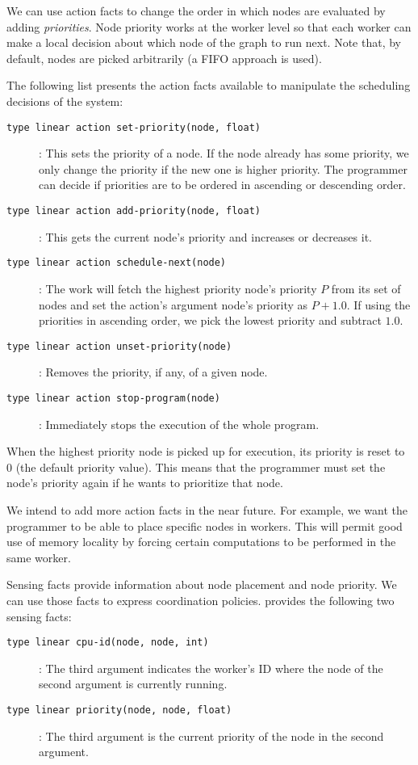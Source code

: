 We can use action facts to change the order in which nodes are evaluated by adding
\emph{priorities}. Node priority works at the worker level
so that each worker can make a local decision about which node of the graph to run next.
Note that, by default, nodes are picked arbitrarily (a FIFO approach is used).

The following list presents the action facts available to manipulate the scheduling decisions of the system:

\begin{description}
   \item[\texttt{type linear action set-priority(node, float)}]: This sets the priority of a node. If the node already has some priority, we only change the priority if the new one is higher priority. The programmer can decide if priorities are to be ordered in ascending or descending order.
   \item[\texttt{type linear action add-priority(node, float)}]: This gets the current node's priority and increases or decreases it.
   \item[\texttt{type linear action schedule-next(node)}]: The work will fetch the highest priority node's priority $P$ from its set of nodes and set the action's argument node's priority as $P + 1.0$. If using the priorities
   in ascending order, we pick the lowest priority and subtract $1.0$.
   \item[\texttt{type linear action unset-priority(node)}]: Removes the priority, if any, of a given node.
   \item[\texttt{type linear action stop-program(node)}]: Immediately stops the execution of the whole program.
\end{description}

When the highest priority node is picked up for execution, its priority is reset to 0 (the default priority value). This means that
the programmer must set the node's priority again if he wants to prioritize that node.

We intend to add more action facts in the near future. For example, we want the programmer to be able to place specific nodes in workers. This will permit good use of
memory locality by forcing certain computations to be performed in the same worker.

Sensing facts provide information about node placement and node priority. We can use those facts
to express coordination policies. \lang provides the following two
sensing facts:

\begin{description}
   \item[\texttt{type linear cpu-id(node, node, int)}]: The third argument indicates the worker's ID where the node of the second argument is currently running.
   \item[\texttt{type linear priority(node, node, float)}]: The third argument is the current priority of the node in the second argument.
\end{description}

